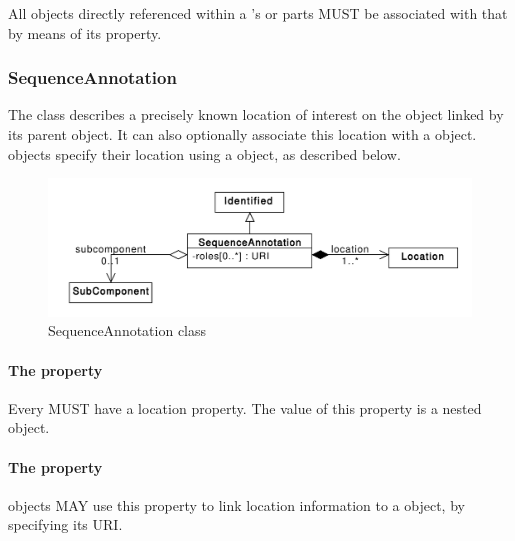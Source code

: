 All  objects directly referenced within a 's  or  parts MUST be associated with that  by means of its  property.


\subsubsection{SequenceAnnotation}
\label{sec:SequenceAnnotation}
The  class describes a precisely known location of interest on the  object linked by its parent  object.  It can also optionally associate this location with a  object.  objects specify their location using a  object, as described below.


\begin{figure}[ht]
\begin{center}
\includegraphics[scale=0.6]{uml/sequence_annotation}
\caption[]{SequenceAnnotation class}
\label{uml:sequence_annotation}
\end{center}
\end{figure}

\paragraph{The  property}
Every  MUST have a location property. The value of this property is a nested  object.

\paragraph{The  property}
 objects MAY use this property to link location information to a  object, by specifying its URI.


